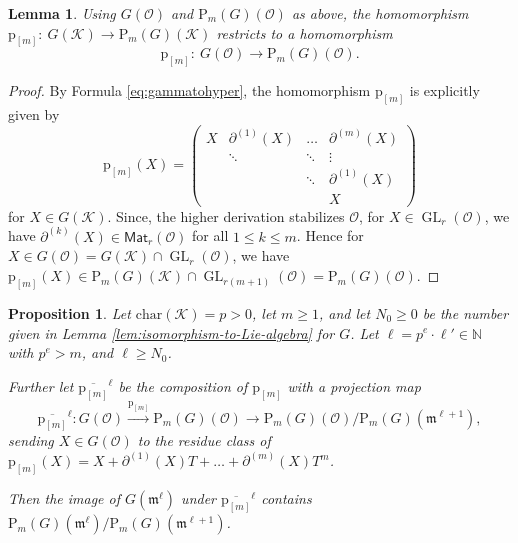 \documentclass[10pt,a4paper]{amsart}
\theoremstyle{plain} %
\newtheorem{Lemma}[Theorem]{Lemma}
\newtheorem{Proposition}[Theorem]{Proposition}
\theoremstyle{definition}
\theoremstyle{remark}
\newcommand{\NN}{\mathbb{N}}  %
\newcommand{\cK}{\mathcal{K}}   %
\newcommand{\cO}{\mathcal{O}}   %
\newcommand{\fm}{\mathfrak{m}}  %
\newcommand{\rP}[1]{\mathrm{P}_{\!#1}}
\newcommand{\Mat}{\mathsf{Mat}}
\newcommand{\GL}{\operatorname{GL}}
\newcommand{\hd}[2]{\partial^{(#1)}\!\!\left(#2\right)} %
\newcommand{\prol}[1]{\mathrm{p}_{[#1]}}
\numberwithin{equation}{subsection}
\begin{document}
\begin{Lemma}\label{lem:restriction-of-prol-map}
    Using $G(\cO)$ and $\rP{m}(G)(\cO)$ as above,
    the homomorphism $\prol{m}:~G(\cK)\to \rP{m}(G)(\cK)$ restricts to a homomorphism
    \[ \prol{m}:~G(\cO)\to \rP{m}(G)(\cO).\]
\end{Lemma}

\begin{proof}
    By Formula \ref{eq:gammatohyper}, the homomorphism $\prol{m}$ is explicitly given by
   \[  \prol{m}(X)=\begin{pmatrix}
			X & \hd{1}{X} & \dots& \hd{m}{X} \\
			&    \ddots     & \ddots&\vdots\\
			&&\ddots&\hd{1}{X}\\
			&&&X
		\end{pmatrix} \]
        for $X\in G(\cK)$. Since, the higher derivation stabilizes $\cO$, for $X\in \GL_r(\cO)$, we have $\hd{k}{X}\in \Mat_r(\cO)$ for all $1\leq k \leq m$. Hence for $X\in G(\cO)=G(\cK)\cap \GL_r(\cO)$, we have $\prol{m}(X)\in \rP{m}(G)(\cK)\cap \GL_{r(m+1)}(\cO)=\rP{m}(G)(\cO)$.
\end{proof}



	
\begin{Proposition}\label{prop:rho-bar}
Let $\textrm{char}(\cK)=p>0$, let $m\geq 1$, and let $N_0\geq 0$ be the number given in Lemma \ref{lem:isomorphism-to-Lie-algebra} for $G$.
Let $\ell=p^e\cdot \ell'\in \NN$ with $p^e>m$, and $\ell \geq N_0$. 

Further let $\overline{\prol{m}}^\ell$ be the composition of $\prol{m}$ with a projection map
\[ \overline{\prol{m}}^\ell: G(\cO) \xrightarrow{\prol{m}} \rP{m}(G)(\cO) \to \rP{m}(G)(\cO)/\rP{m}(G)(\fm^{\ell+1}),\]
sending $X\in G(\cO)$ to the residue class of $\prol{m}(X)=X+\hd{1}{X}T+\ldots+ \hd{m}{X}T^m$.

Then the image of $G(\fm^\ell)$ under $\overline{\prol{m}}^\ell$ contains $\rP{m}(G)(\fm^\ell)/\rP{m}(G)(\fm^{\ell+1})$.
\end{Proposition}	
\end{document}
